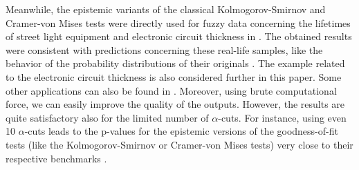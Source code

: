 Meanwhile, the epistemic variants of the classical Kolmogorov-Smirnov and Cramer-von Mises tests were directly used for fuzzy data concerning the lifetimes of street light equipment \citep{Hesamian2013} and electronic circuit thickness \citep{FARAZ20102684} in \cite{PGMR2024AMS}.
The obtained results were consistent with predictions concerning these real-life samples, like the behavior of the probability distributions of their originals \citep{Gibbons2010}.
The example related to the electronic circuit thickness is also considered further in this paper.
Some other applications can also be found in \citep{10.1007/978-3-031-08974-9_39,pgmr2022,GrzegorzewskiRom2021,PGMR2024AMS}.
Moreover, using brute computational force, we can easily improve the quality of the outputs.
However, the results are quite satisfactory also for the limited number of $\alpha$-cuts.
For instance, using even 10 $\alpha$-cuts leads to the p-values for the epistemic versions of the goodness-of-fit tests (like the Kolmogorov-Smirnov or Cramer-von Mises tests) very close to their respective benchmarks \citep{PGMR2024AMS}.
